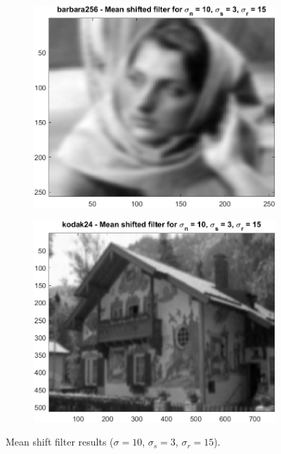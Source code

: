 \documentclass{article}
\begin{document}
\begin{figure}[H]
    \centering
    \begin{subfigure}[b]{0.45\textwidth}
        \includegraphics[width=\textwidth]{../images/barbara_10_3_15.png}
    \end{subfigure}
    \begin{subfigure}[b]{0.45\textwidth}
        \includegraphics[width=\textwidth]{../images/kodak_10_3_15.png}
    \end{subfigure}
    \caption{Mean shift filter results ($\sigma = 10$, $\sigma_s = 3$, $\sigma_r = 15$).}
\end{figure}
\end{document}
